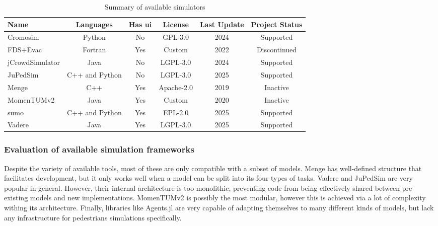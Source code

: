 \documentclass[twoside, 11pt]{article}
\begin{document}
\begin{center}
  \begin{table}
    \begin{tabularx}{\textwidth}{ | X | c | c | c | c | c | } 
      \hline
      Name & Languages & Has \gls{ui} & License & Last Update & Project Status \\ 
      \hline
      Cromosim & Python & No & GPL-3.0 & 2024 & Supported\\
      \hline
      FDS+Evac & Fortran & Yes & Custom & 2022 & Discontinued \\
      \hline
      jCrowdSimulator & Java & No & LGPL-3.0 & 2024 & Supported \\
      \hline
      JuPedSim & C++ and Python & No & LGPL-3.0 & 2025 & Supported \\
      \hline
      Menge & C++ & Yes & Apache-2.0 & 2019 & Inactive \\
      \hline 
      MomenTUMv2 & Java & Yes & Custom & 2020 & Inactive \\
      \hline 
      \gls{sumo} & C++ and Python & Yes & EPL-2.0 & 2025 & Supported \\
      \hline 
      Vadere & Java & Yes & LGPL-3.0 & 2025 & Supported \\
      \hline 

    \end{tabularx}
    \caption{Summary of available simulators}
    \label{table:available-simulators-summary}
  \end{table}
\end{center}

\subsubsection{Evaluation of available simulation frameworks}

Despite the variety of available tools, most of these are only compatible with a subset of models. Menge has well-defined structure that facilitates development, but it only works well when a model can be split into its four types of tasks. Vadere and JuPedSim are very popular in general. However, their internal architecture is too monolithic, preventing code from being effectively shared between pre-existing models and new implementations. MomenTUMv2 is possibly the most modular, however this is achieved via a lot of complexity withing its architecture. Finally, libraries like Agents.jl are very capable of adapting themselves to many different kinds of models, but lack any infrastructure for pedestrians  simulations specifically.
\end{document}
